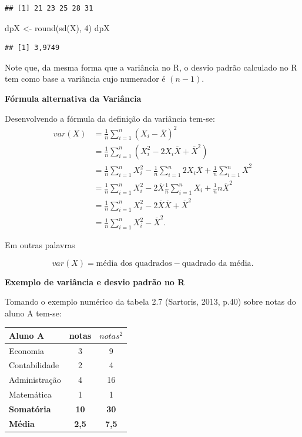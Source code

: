 \documentclass[
]{book}
\newenvironment{Shaded}{\begin{snugshade}}{\end{snugshade}}
\newcommand{\DecValTok}[1]{\textcolor[rgb]{0.00,0.00,0.81}{#1}}
\newcommand{\FunctionTok}[1]{\textcolor[rgb]{0.00,0.00,0.00}{#1}}
\newcommand{\NormalTok}[1]{#1}
\newcommand{\OtherTok}[1]{\textcolor[rgb]{0.56,0.35,0.01}{#1}}
\begin{document}
\begin{verbatim}
## [1] 21 23 25 28 31
\end{verbatim}

\begin{Shaded}
\begin{Highlighting}[]
\NormalTok{dpX }\OtherTok{\textless{}{-}} \FunctionTok{round}\NormalTok{(}\FunctionTok{sd}\NormalTok{(X), }\DecValTok{4}\NormalTok{)}
\NormalTok{dpX}
\end{Highlighting}
\end{Shaded}

\begin{verbatim}
## [1] 3,9749
\end{verbatim}

Note que, da mesma forma que a variância no R, o desvio padrão calculado no R tem como base a variância cujo numerador é \((n-1)\).

\textbf{Fórmula alternativa da Variância}

Desenvolvendo a fórmula da definição da variância tem-se:
\begin{align*}
  var(X)  &= \frac{1}{n}\sum_{i=1}^{n}(X_i - \overline{X})^2 \\
          &= \frac{1}{n}\sum_{i=1}^{n}(X_i^2 - 2X_i\overline{X} +
          \overline{X}^2)\\
          &= \frac{1}{n}\sum_{i=1}^{n}X_i^2 - 
          \frac{1}{n}\sum_{i=1}^{n}2X_i\overline{X}+
          \frac{1}{n}\sum_{i=1}^{n}\overline{X}^2\\
          &= \frac{1}{n}\sum_{i=1}^{n}X_i^2 - 
          2\overline{X}\frac{1}{n}\sum_{i=1}^{n}X_i+
          \frac{1}{n}n\overline{X}^2\\
          &= \frac{1}{n}\sum_{i=1}^{n}X_i^2 - 
          2\overline{X}\overline{X}+ \overline{X}^2\\
          &= \frac{1}{n}\sum_{i=1}^{n}X_i^2 - \overline{X}^2.
\end{align*}

Em outras palavras

\begin{equation*}
  var(X) = \text{média dos quadrados} - \text{quadrado da média}.
\end{equation*}

\textbf{Exemplo de variância e desvio padrão no R}

Tomando o exemplo numérico da tabela 2.7 (Sartoris, 2013, p.40) sobre notas do
aluno A tem-se:

\begin{longtable}[]{@{}lcc@{}}
\toprule
Aluno A & notas & \(notas^2\) \\
\midrule
\endhead
Economia & 3 & 9 \\
Contabilidade & 2 & 4 \\
Administração & 4 & 16 \\
Matemática & 1 & 1 \\
\textbf{Somatória} & \textbf{10} & \textbf{30} \\
\textbf{Média} & \textbf{2,5} & \textbf{7,5} \\
\bottomrule
\end{longtable}
\end{document}
